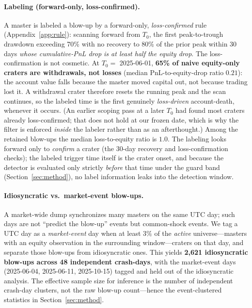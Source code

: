 \documentclass[11pt,a4paper]{article}
\newcommand{\Tnull}{T_{0}}
\begin{document}
\paragraph{Labeling (forward-only, loss-confirmed).}
A master is labeled a blow-up by a forward-only, \emph{loss-confirmed} rule
(Appendix~\ref{app:rule}): scanning forward from $\Tnull$, the first peak-to-trough
drawdown exceeding 70\% with no recovery to 80\% of the prior peak within 30 days
\emph{whose cumulative-PnL drop is at least half the equity drop}. The
loss-confirmation is not cosmetic. At $\Tnull = $ 2025-06-01, \textbf{65\% of naive
equity-only craters are withdrawals, not losses} (median PnL-to-equity-drop ratio
$0.21$): the account value falls because the master moved capital out, not because
trading lost it. A withdrawal crater therefore resets the running peak and the scan
continues, so the labeled time is the first genuinely \emph{loss-driven}
account-death, whenever it occurs. (An earlier scoping pass at a later $\Tnull$ had
found most craters already loss-confirmed; that does not hold at our frozen date,
which is why the filter is enforced \emph{inside} the labeler rather than as an
afterthought.) Among the retained blow-ups the median loss-to-equity ratio is
$1.0$. The labeling looks forward only to \emph{confirm} a crater (the 30-day
recovery and loss-confirmation checks); the labeled trigger time itself is the crater
onset, and because the detector is evaluated only strictly \emph{before} that time
under the guard band (Section~\ref{sec:method}), no label information leaks into the
detection window.

\paragraph{Idiosyncratic vs.\ market-event blow-ups.}
A market-wide dump synchronizes many masters on the same UTC day; such days are not
``predict the blow-up'' events but common-shock events. We tag a UTC day as a
\emph{market-event} day when at least $3\%$ of the \emph{active} universe---masters
with an equity observation in the surrounding window---craters on that day, and
separate those blow-ups from idiosyncratic ones. This yields \textbf{2{,}621
idiosyncratic blow-ups across 48 independent crash-days}, with the market-event
days (2025-06-04, 2025-06-11, 2025-10-15) tagged and held out of the idiosyncratic
analysis. The effective sample size for inference is the number of independent
crash-day clusters, not the raw blow-up count---hence the event-clustered
statistics in Section~\ref{sec:method}.
\end{document}
